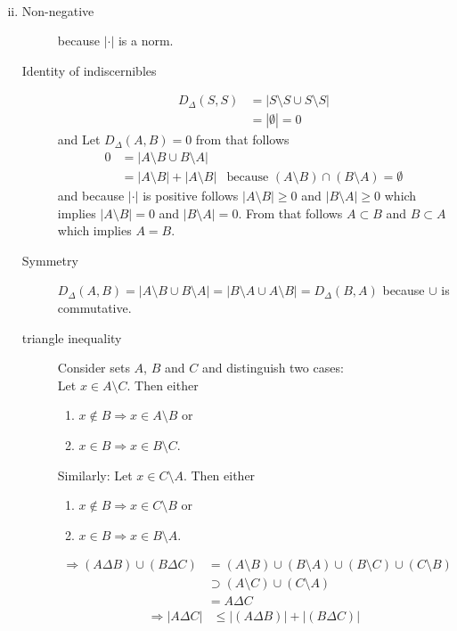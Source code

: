\documentclass[10pt,a4paper,boxed]{hmcpset}
\begin{document}
\begin{solution}
\begin{enumerate}[(i)]
\begin{description}
\begin{align*}
							\end{align*}
					\end{description}
				\item 
					\begin{description}
						\item[Non-negative] because $|\cdot|$ is a norm.
						\item[Identity of indiscernibles] 
							\begin{align}
								D_\Delta(S,S) &= |S\setminus S \cup S\setminus S| \\
															&= | \emptyset	| = 0
							\end{align}
							and
							Let $D_\Delta(A,B) = 0$ from that follows 
							\begin{align}
								 0 &= |A\setminus B \cup B \setminus A| \\
								 &= | A \setminus B| + | A \setminus B| & \text{because } (A \setminus B) \cap (B \setminus A) = \emptyset \label{leererschnitt}
							\end{align}
							and because $| \cdot |$ is positive follows $|A \setminus B| \geq 0$ and $|B\setminus A| \geq 0$ which implies
							$|A \setminus B| = 0$ and $|B\setminus A| = 0$. From that follows $A \subset B$ and $B \subset A$ which implies $A=B$.
						\item[Symmetry] $D_\Delta(A,B) = |A \setminus B \cup B \setminus A| = | B \setminus A \cup A \setminus B| = D_\Delta(B,A)$ because $\cup$ is commutative.
						\item[triangle inequality]							
							Consider sets $A$, $B$ and $C$ and distinguish two cases:\\
							Let $x\in A \setminus C$. Then either
							\begin{enumerate}
								\item $x \notin B \Rightarrow x \in A \setminus B$ or
								\item $x \in B \Rightarrow x \in B \setminus C$.
							\end{enumerate}
							Similarly: Let $x\in C \setminus A$. Then either
							\begin{enumerate}
								\item $x \notin B \Rightarrow x \in C \setminus B$ or
								\item $x \in B \Rightarrow x \in B \setminus A$.
							\end{enumerate}
							\begin{align*}
								\Rightarrow (A \Delta B) \cup (B \Delta C) &= (A \setminus B) \cup (B \setminus A) \cup (B \setminus C ) \cup (C \setminus B)  \\
								&\supset (A \setminus C) \cup (C \setminus A)  \\
								&=  A \Delta C
							\end{align*}
							\begin{align*}
								\Rightarrow  \left\vert A \Delta C \right\vert &\leq \left\vert (A \Delta B) \right\vert + \left\vert (B \Delta C) \right\vert
							\end{align*}
							

\end{description}
\end{enumerate}
\end{solution}
\end{document}

